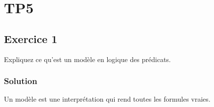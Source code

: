 \section{TP5}








\subsection*{Exercice 1}
Expliquez ce qu'est un modèle en logique des prédicats. 

    \subsubsection*{Solution}
    
    Un modèle est une interprétation qui rend toutes les formules vraies.
    
